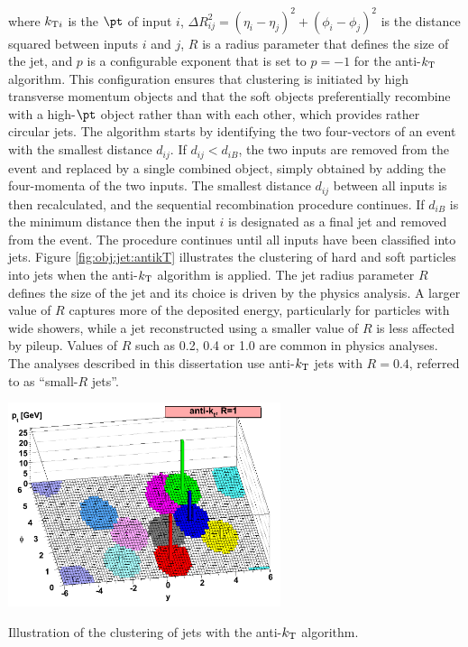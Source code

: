 \noindent where $k_{{\rm T}i}$ is the $\pt$ of input $i$, $\Delta R^{2}_{ij}= (\eta_{i}-\eta_{j})^{2} + (\phi_{i}-\phi_{j})^{2}$ is the distance squared between inputs $i$ and $j$, $R$ is a radius parameter that defines the size of the jet, and $p$ is a configurable exponent that is set to $p=-1$ for the anti-$k_{\rm T}$ algorithm. This configuration ensures that clustering is initiated by high transverse momentum objects and that the soft objects preferentially recombine with a high-$\pt$ object rather than with each other, which provides rather circular jets.
The algorithm starts by identifying the two four-vectors of an event with the smallest distance $d_{ij}$. If $d_{ij} < d_{iB}$, the two inputs are removed from the event and replaced by a single combined object, simply obtained by adding the four-momenta of the two inputs. The smallest distance $d_{ij}$  between all inputs is then recalculated, and the sequential recombination procedure continues. If $d_{iB}$ is the minimum distance then the input $i$ is designated as a final jet and removed from the event. The procedure continues until all inputs have been classified into jets. Figure \ref{fig:obj:jet:antikT} illustrates the clustering of hard and soft particles into jets when the anti-$k_{\rm T}$ algorithm is applied. The jet radius parameter $R$ defines the size of the jet and its choice is driven by the physics analysis. A larger value of  $R$ captures more of the deposited energy, particularly for particles with wide showers, while a jet reconstructed using a smaller value of  $R$ is less affected by pileup. Values of $R$ such as 0.2, 0.4 or 1.0 are common in physics analyses. The analyses described in this dissertation use anti-$k_{\rm T}$ jets with $R = 0.4$, referred to as ``small-$R$ jets''.

\bfig[h!]
\centering
\includegraphics[width=0.6\textwidth]{figures/Objects/antikT.png}
\captionsetup{width=0.85\textwidth} \caption{\small Illustration of the clustering of jets with the anti-$k_{\rm T}$ algorithm.}
\label{fig:obj:jet:antikT}
\efig

